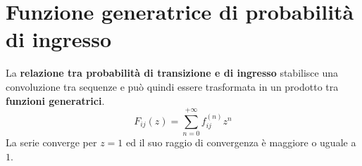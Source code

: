 \documentclass[\main/main.tex]{subfiles}
\begin{document}
\section{Funzione generatrice di probabilità di ingresso}
\begin{definition}
  La \textbf{relazione tra probabilità di transizione e di ingresso} stabilisce una convoluzione tra sequenze e può quindi essere trasformata in un prodotto tra \textbf{funzioni generatrici}.
  \[
    F_{ij}(z) = \sum_{n=0}^{+\infty}f^{(n)}_{ij}z^n
  \]
  La serie converge per \(z=1\) ed il suo raggio di convergenza è maggiore o uguale a \(1\).
\end{definition}
\end{document}
